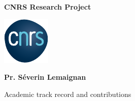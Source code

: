 \documentclass[12pt,a4paper]{article}
\title{\project}
\begin{document}
\begin{center}

    \textbf{\LARGE CNRS Research Project}

    \vspace{1cm}
    \includegraphics[width=0.2\linewidth]{CNRS.pdf}



    \vspace{5cm}
    {\LARGE\bf Pr. Séverin Lemaignan}

    \vspace{3cm}
    {\LARGE Academic track record and contributions}


\end{center}

    \vspace{3cm}

\newpage

\tableofcontents

\pagebreak



\pagebreak
\printbibliography
\end{document}
